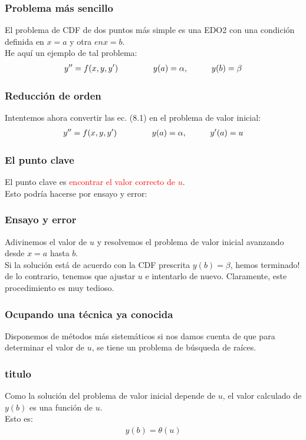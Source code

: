 \documentclass[12pt]{beamer}
\begin{document}
\begin{frame}
\frametitle{Problema más sencillo}
El problema de CDF de dos puntos más simple es una EDO2 con una condición definida en $x = a$ y otra $en x = b$.
\\
\bigskip
\pause
He aquí un ejemplo de tal problema:
\begin{align}
{y}^{\prime \prime} = f (x, y, {y}^{\prime}) \hspace{1.5cm} y (a) = \alpha, \hspace{1cm} y (b) = \beta
\label{eq;ecuacion_08_01}
\end{align}
\end{frame}
\begin{frame}
\frametitle{Reducción de orden}
Intentemos ahora convertir las ec. (8.1) en el problema de valor inicial:
\pause
\begin{align}
{y}^{\prime \prime} = f (x, y, {y}^{\prime}) \hspace{1.5cm} y (a) = \alpha, \hspace{1cm} {y}^{\prime} (a) = u
\label{eq;ecuacion_08_02}    
\end{align}
\end{frame}
\begin{frame}
\frametitle{El punto clave}
El punto clave es \textcolor{red}{encontrar el valor correcto de $u$}.
\\
\bigskip
\pause
Esto podría hacerse por ensayo y error:
\end{frame}
\begin{frame}
\frametitle{Ensayo y error}
Adivinemos el valor de $u$ y resolvemos el problema de valor inicial avanzando desde $x = a$ hasta $b$.
\\
\bigskip
\pause
Si la solución está de acuerdo con la CDF prescrita $y (b) = \beta$, hemos terminado! \pause de lo contrario, \pause tenemos que ajustar $u$ e intentarlo de nuevo. \pause Claramente, este procedimiento es muy tedioso.
\end{frame}
\begin{frame}
\frametitle{Ocupando una técnica ya conocida}
Disponemos de métodos más sistemáticos si nos damos cuenta de que para determinar el valor de $u$, \pause se tiene un problema de búsqueda de raíces.
\end{frame}
\begin{frame}
\frametitle{titulo}
Como la solución del problema de valor inicial depende de $u$, el valor calculado de $y (b)$ es una función de $u$.
\\
\bigskip
\pause
Esto es:
\begin{align*}
y (b) = \theta (u)
\end{align*}
\end{frame}
\end{document}
